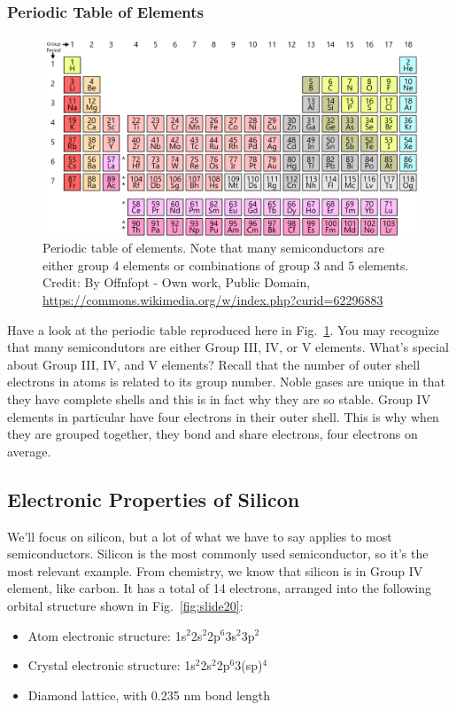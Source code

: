 \subsubsection{Periodic Table of Elements}




\begin{figure}
\begin{center}
\includegraphics[width=\columnwidth]{periodic_table}
\end{center}
\caption{Periodic table of elements.  Note that many semiconductors are either group 4 elements or combinations of group 3 and 5 elements. Credit:  By Offnfopt - Own work, Public Domain, \url{https://commons.wikimedia.org/w/index.php?curid=62296883 }} \label{fig:periodic_table}
\end{figure}


Have a look at the periodic table reproduced here in Fig.~\ref{fig:periodic_table}.  You may recognize that many semicondutors are either Group III, IV, or V elements.   What's special about Group III, IV, and V elements?  Recall that the number of outer shell electrons in atoms is related to its group number.  Noble gases are unique in that they have complete shells and this is in fact why they are so stable.  Group IV elements in particular have four electrons in their outer shell.  This is why when they are grouped together, they bond and share electrons, four electrons on average.




\subsection{Electronic Properties of Silicon}

 We'll focus on silicon, but a lot of what we have to say applies to most semiconductors.  Silicon is the most commonly used semiconductor, so it's the most relevant example.  From chemistry, we know that silicon is in Group IV element, like carbon.  It has a total of 14 electrons, arranged into the following orbital structure shown in Fig.~\ref{fig:slide20}:
 \begin{itemize}
\item   Atom electronic structure: 1s$^2$2s$^2$2p$^6$3s$^2$3p$^2$
\item   Crystal electronic structure: 1s$^2$2s$^2$2p$^6$3(sp)$^4$
\item   Diamond lattice, with 0.235 nm bond length
\end{itemize}
 
